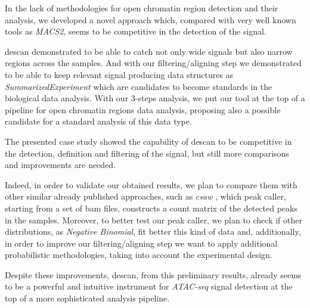 In the lack of methodologies for open chromatin region detection and their analysis, we developed a novel approach which, compared with very well known tools as \textit{MACS2}, seems to be competitive in the detection of the signal.

\gls{descan} demonstrated to be able to catch not only wide signals but also narrow regions across the samples. 
And with our filtering/aligning step we demonstrated to be able to keep relevant signal producing data structures as \textit{SummarizedExperiment} which are candidates to become standards in the biological data analysis.
With our 3-steps analysis, we put our tool at the top of a pipeline for open chromatin regions data analysis, proposing also a possible candidate for a standard analysis of this data type.

The presented case study showed the capability of \gls{descan} to be competitive in the detection, definition and filtering of the signal, but still more comparisons and improvements are needed.

Indeed, in order to validate our obtained results, we plan to compare them with other similar already published approaches, such as \textit{csaw} \cite{Lun2015}, which peak caller, starting from a set of \gls{bam} files, constructs a count matrix of the detected peaks in the samples.
Moreover, to better test our peak caller, we plan to check if other distributions, as \textit{Negative Binomial}, fit better this kind of data and, additionally, in order to improve our filtering/aligning step we want to apply additional probabilistic methodologies, taking into account the experimental design.

Despite these improvements, \gls{descan}, from this preliminary results, already seems to be a powerful and intuitive instrument for \textit{ATAC-seq} signal detection at the top of a more sophisticated analysis pipeline.

